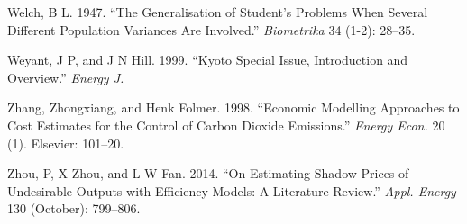 \documentclass[12pt,]{article}
\begin{document}
\leavevmode\hypertarget{ref-Welch1947}{}%
Welch, B L. 1947. ``The Generalisation of Student's Problems When Several Different Population Variances Are Involved.'' \emph{Biometrika} 34 (1-2): 28--35.

\leavevmode\hypertarget{ref-Weyant1999}{}%
Weyant, J P, and J N Hill. 1999. ``Kyoto Special Issue, Introduction and Overview.'' \emph{Energy J.}

\leavevmode\hypertarget{ref-Zhang1998}{}%
Zhang, Zhongxiang, and Henk Folmer. 1998. ``Economic Modelling Approaches to Cost Estimates for the Control of Carbon Dioxide Emissions.'' \emph{Energy Econ.} 20 (1). Elsevier: 101--20.

\leavevmode\hypertarget{ref-Zhou2014}{}%
Zhou, P, X Zhou, and L W Fan. 2014. ``On Estimating Shadow Prices of Undesirable Outputs with Efficiency Models: A Literature Review.'' \emph{Appl. Energy} 130 (October): 799--806.
\end{document}
